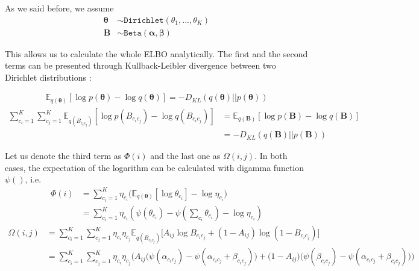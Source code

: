 \documentclass{article}
\renewcommand{\v}[1]{\bm{#1}}
\newcommand{\E}{\mathbb{E}}
\begin{document}
As we said before, we assume 
\begin{align*}
\v{\theta} &\sim \mathtt{Dirichlet}(\theta_1,...,\theta_K)\\
\v{B} &\sim \mathtt{Beta}(\v{\alpha},\v{\beta})
\end{align*}


This allows us to calculate the whole ELBO analytically. The first and the second terms can be presented through Kullback-Leibler divergence between two Dirichlet distributions \cite{bibid}:

\begin{equation}
\begin{split}
\E_{q(\v{\theta})}\left[\log p(\v{\theta}) - \log q(\v{\theta})\right] = - D_{KL} \left(q(\v{\theta})||p(\v{\theta})\right) 
\end{split}
\end{equation}
\begin{equation}
\begin{split}
\sum_{c_i=1}^K \sum_{c_j=1}^K \E_{q(B_{c_ic_j})}[\log p(B_{c_ic_j}) - \log q(B_{c_ic_j})] &= 
\E_{q(\v{B})}[\log p(\v{B}) - \log q(\v{B})]\\ &= - D_{KL}\left(q(\v{B})||p(\v{B})\right)
\end{split}
\end{equation}

Let us denote the third term as $\Phi(i)$ and the last one as $\Omega(i,j)$. In both cases, the expectation of the logarithm can be calculated with digamma function $\psi()$, i.e.
\begin{equation}
\begin{split}
\Phi(i) &= \sum_{c_i=1}^K \eta_{c_i} \biggl(\E_{q(\v{\theta})}[\log \theta_{c_i}] - \log \eta_{c_i}\biggr) \\
&= \sum_{c_i=1}^K \eta_{c_i} \left(\psi(\theta_{c_i}) - \psi \left(\sum_{c_i}\theta_{c_i}\right) - \log \eta_{c_i}\right) 
\end{split}
\end{equation}
\begin{equation}
\begin{split}
\Omega(i,j) &= \sum_{c_i=1}^K \sum_{c_j=1}^K \eta_{c_i} \eta_{c_j}
\E_{q(B_{c_ic_j})}\biggl[ A_{ij} \log B_{c_ic_j} + (1 - A_{ij}) \log (1 - B_{c_ic_j}) \biggr]\\
&= \sum_{c_i=1}^K \sum_{c_j=1}^K \eta_{c_i} \eta_{c_j} \Biggl(A_{ij} \biggl(\psi(\alpha_{c_ic_j}) - \psi(\alpha_{c_ic_j} + \beta_{c_ic_j})\biggr) + \biggl(1 - A_{ij}\biggr)\biggl(\psi(\beta_{c_ic_j}) - \psi(\alpha_{c_ic_j} + \beta_{c_ic_j})\biggr)\Biggr)
\end{split}
\end{equation} 
\end{document}
